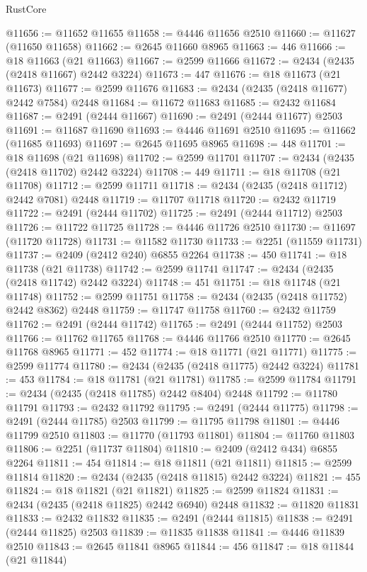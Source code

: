 \begin{lexlean}{RustCore}
\begin{coremodule}
@11656 := @11652 @11655
@11658 := @4446 @11656 @2510
@11660 := @11627 (@11650 @11658)
@11662 := @2645 @11660 @8965
@11663 := 446
@11666 := @18 @11663 (@21 @11663)
@11667 := @2599 @11666
@11672 := @2434 (@2435 (@2418 @11667) @2442 @3224)
@11673 := 447
@11676 := @18 @11673 (@21 @11673)
@11677 := @2599 @11676
@11683 := @2434 (@2435 (@2418 @11677) @2442 @7584) @2448
@11684 := @11672 @11683
@11685 := @2432 @11684
@11687 := @2491 (@2444 @11667)
@11690 := @2491 (@2444 @11677) @2503
@11691 := @11687 @11690
@11693 := @4446 @11691 @2510
@11695 := @11662 (@11685 @11693)
@11697 := @2645 @11695 @8965
@11698 := 448
@11701 := @18 @11698 (@21 @11698)
@11702 := @2599 @11701
@11707 := @2434 (@2435 (@2418 @11702) @2442 @3224)
@11708 := 449
@11711 := @18 @11708 (@21 @11708)
@11712 := @2599 @11711
@11718 := @2434 (@2435 (@2418 @11712) @2442 @7081) @2448
@11719 := @11707 @11718
@11720 := @2432 @11719
@11722 := @2491 (@2444 @11702)
@11725 := @2491 (@2444 @11712) @2503
@11726 := @11722 @11725
@11728 := @4446 @11726 @2510
@11730 := @11697 (@11720 @11728)
@11731 := @11582 @11730
@11733 := @2251 (@11559 @11731)
@11737 := @2409 (@2412 @240) @6855 @2264
@11738 := 450
@11741 := @18 @11738 (@21 @11738)
@11742 := @2599 @11741
@11747 := @2434 (@2435 (@2418 @11742) @2442 @3224)
@11748 := 451
@11751 := @18 @11748 (@21 @11748)
@11752 := @2599 @11751
@11758 := @2434 (@2435 (@2418 @11752) @2442 @8362) @2448
@11759 := @11747 @11758
@11760 := @2432 @11759
@11762 := @2491 (@2444 @11742)
@11765 := @2491 (@2444 @11752) @2503
@11766 := @11762 @11765
@11768 := @4446 @11766 @2510
@11770 := @2645 @11768 @8965
@11771 := 452
@11774 := @18 @11771 (@21 @11771)
@11775 := @2599 @11774
@11780 := @2434 (@2435 (@2418 @11775) @2442 @3224)
@11781 := 453
@11784 := @18 @11781 (@21 @11781)
@11785 := @2599 @11784
@11791 := @2434 (@2435 (@2418 @11785) @2442 @8404) @2448
@11792 := @11780 @11791
@11793 := @2432 @11792
@11795 := @2491 (@2444 @11775)
@11798 := @2491 (@2444 @11785) @2503
@11799 := @11795 @11798
@11801 := @4446 @11799 @2510
@11803 := @11770 (@11793 @11801)
@11804 := @11760 @11803
@11806 := @2251 (@11737 @11804)
@11810 := @2409 (@2412 @434) @6855 @2264
@11811 := 454
@11814 := @18 @11811 (@21 @11811)
@11815 := @2599 @11814
@11820 := @2434 (@2435 (@2418 @11815) @2442 @3224)
@11821 := 455
@11824 := @18 @11821 (@21 @11821)
@11825 := @2599 @11824
@11831 := @2434 (@2435 (@2418 @11825) @2442 @6940) @2448
@11832 := @11820 @11831
@11833 := @2432 @11832
@11835 := @2491 (@2444 @11815)
@11838 := @2491 (@2444 @11825) @2503
@11839 := @11835 @11838
@11841 := @4446 @11839 @2510
@11843 := @2645 @11841 @8965
@11844 := 456
@11847 := @18 @11844 (@21 @11844)

\end{coremodule}
\end{lexlean}
